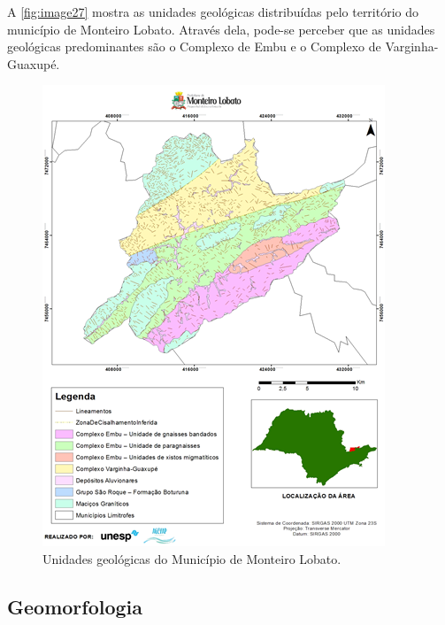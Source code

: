A \autoref{fig:image27} mostra as unidades geológicas distribuídas pelo território do município de Monteiro Lobato. Através dela, pode-se perceber que as unidades geológicas predominantes são o Complexo de Embu e o Complexo de Varginha-Guaxupé.
\clearpage
\begin{figure}[h!]
	\centering
	\includegraphics[width=1\linewidth]{produtos/proddois/image27}
	\caption{Unidades geológicas do Município de Monteiro Lobato.}
	\label{fig:image27}
\end{figure}

\subsection{Geomorfologia}

